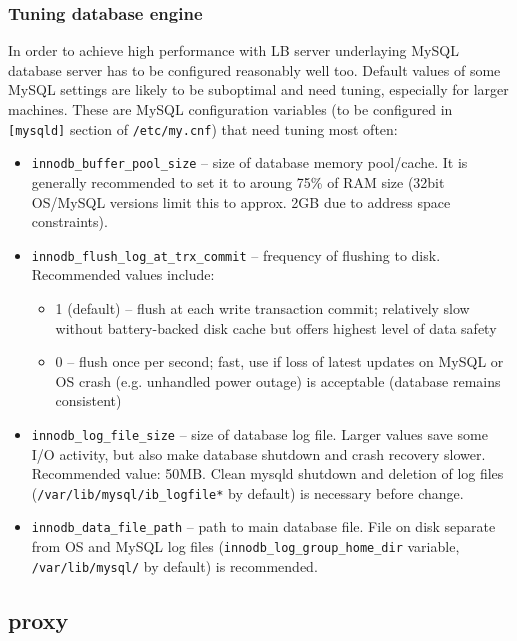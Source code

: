 \subsubsection{Tuning database engine}
\label{inst:db_tuning}

In order to achieve high performance with LB server underlaying MySQL 
database server has to be configured reasonably well too. 
Default values of some MySQL settings are likely to be suboptimal
and need tuning, especially for larger machines.
These are MySQL configuration variables (to be configured in \texttt{[mysqld]} 
section of \texttt{/etc/my.cnf}) that need tuning most often:
\begin{itemize}
\item \texttt{innodb\_buffer\_pool\_size} -- size of database memory pool/cache. 
It is generally recommended to set it to aroung 75\% of RAM size
(32bit OS/MySQL versions limit this to approx. 2GB due to address space 
constraints).

\item \texttt{innodb\_flush\_log\_at\_trx\_commit} -- frequency of flushing to disk.
Recommended values include:
\begin{itemize}
\item 1 (default) -- flush at each write transaction commit; relatively
slow without battery-backed disk cache but offers highest level of data safety
\item 0 -- flush once per second; fast, use if loss of latest updates on MySQL
or OS crash (e.g. unhandled power outage) is acceptable (database remains consistent)
\end{itemize}

\item \texttt{innodb\_log\_file\_size} -- size of database log file. Larger values
save some I/O activity, but also make database shutdown and crash recovery slower.
Recommended value: 50MB. Clean mysqld shutdown and deletion of log files 
(\texttt{/var/lib/mysql/ib\_logfile*} by default) is necessary before change.

\item \texttt{innodb\_data\_file\_path} -- path to main database file. File on
disk separate from OS and MySQL log files (\texttt{innodb\_log\_group\_home\_dir} variable,
\texttt{/var/lib/mysql/} by default) is recommended.

\end{itemize}

\subsection{\LB proxy}
\label{inst:LBproxy}


